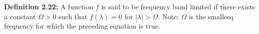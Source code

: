 {\bf Definition 2.22:} A function $f$ is said to be frequency band limited if there exists a constant $\Omega>0$ such that $f(\lambda)=0$ for $|\lambda|>\Omega$. Note: $\Omega$ is the smallesq frequency for which the preceding equation is true.